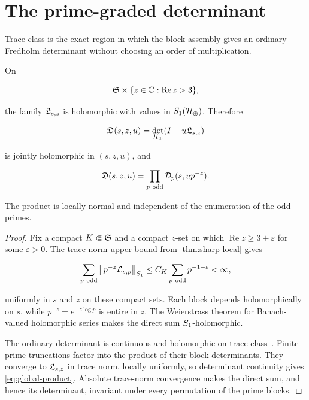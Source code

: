\section{The prime-graded determinant}
\label{sec:global-determinant}

Trace class is the exact region in which the block assembly gives an ordinary
Fredholm determinant without choosing an order of multiplication.

\begin{theorem}
\label{thm:global-det}
On

\[
 \mathfrak S\times\{z\in\mathbb C:\operatorname{Re}z>3\},
\]

the family \(\mathfrak L_{s,z}\) is holomorphic with values in
\(S_{1}(\mathcal H_\oplus)\).  Therefore

\begin{equation}
 \mathfrak D(s,z,u)=\det_{\mathcal H_\oplus}(I-u\mathfrak L_{s,z})
 \label{eq:global-det}
\end{equation}

is jointly holomorphic in \((s,z,u)\), and

\begin{equation}
 \mathfrak D(s,z,u)
 =\prod_{p\ \mathrm{odd}}\mathcal D_p(s,up^{-z}).
 \label{eq:global-product}
\end{equation}

The product is locally normal and independent of the enumeration of the odd
primes.
\end{theorem}

\begin{proof}
Fix a compact \(K\Subset\mathfrak S\) and a compact \(z\)-set on which
\(\operatorname{Re}z\ge3+\varepsilon\) for some \(\varepsilon>0\).  The
trace-norm upper bound from \cref{thm:sharp-local} gives

\begin{equation}
 \sum_{p\ \odd}\Norm{p^{-z}\cL_{s,p}}_{\Schatten 1}
 \le C_K\sum_{p\ \odd}p^{-1-\varepsilon}<\infty,
 \label{eq:S1-prime-majorant}
\end{equation}

uniformly in \(s\) and \(z\) on these compact sets.  Each block depends
holomorphically on \(s\), while \(p^{-z}=e^{-z\log p}\) is entire in \(z\).
The Weierstrass theorem for Banach-valued holomorphic series makes the direct
sum \(S_{1}\)-holomorphic.

The ordinary determinant is continuous and holomorphic on trace
class~\citep{simon2005}.  Finite prime truncations factor into the product of
their block determinants.  They converge to \(\mathfrak L_{s,z}\) in trace norm,
locally uniformly, so determinant continuity gives
\cref{eq:global-product}.  Absolute trace-norm convergence makes the direct
sum, and hence its determinant, invariant under every permutation of the
prime blocks.
\end{proof}

